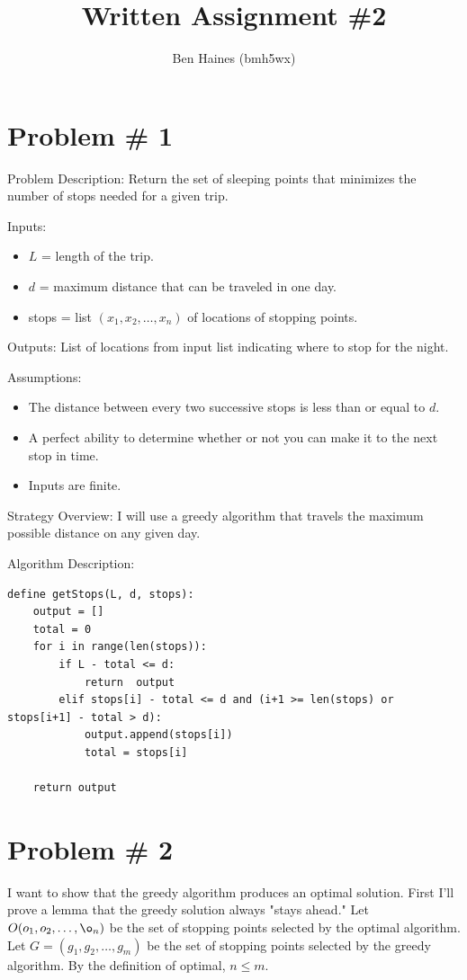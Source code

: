 \documentclass{article}
\begin{document}
\title{Written Assignment \#2}
\author{Ben Haines (bmh5wx)}

\section*{Problem \# 1}
Problem Description: Return the set of sleeping points that minimizes the number of stops needed for a given trip.

Inputs:
\begin{itemize}
    \item $L$ = length of the trip.
    \item $d$ = maximum distance that can be traveled in one day.
    \item stops = list $(x_1, x_2, \ldots, x_n)$ of locations of stopping points.
\end{itemize}

Outputs: List of locations from input list indicating where to stop for the night.

Assumptions:
\begin{itemize}
    \item The distance between every two successive stops is less than or equal to $d$.
    \item A perfect ability to determine whether or not you can make it to the next stop in time.
    \item Inputs are finite.
\end{itemize}

Strategy Overview:
I will use a greedy algorithm that travels the maximum possible distance on any given day.

Algorithm Description:
\begin{lstlisting}
define getStops(L, d, stops):
    output = []
    total = 0
    for i in range(len(stops)):
        if L - total <= d:
            return  output
        elif stops[i] - total <= d and (i+1 >= len(stops) or stops[i+1] - total > d):
            output.append(stops[i])
            total = stops[i]

    return output
\end{lstlisting}

\section*{Problem \# 2}
I want to show that the greedy algorithm produces an optimal solution. First I'll prove a lemma that the greedy solution always "stays ahead." Let $O(o_1, o_2, \ldots, \o_n)$ be the set of stopping points selected by the optimal algorithm. Let $G = (g_1, g_2, \ldots, g_m)$ be the set of stopping points selected by the greedy algorithm. By the definition of optimal, $n \le m$. \\
\end{document}
